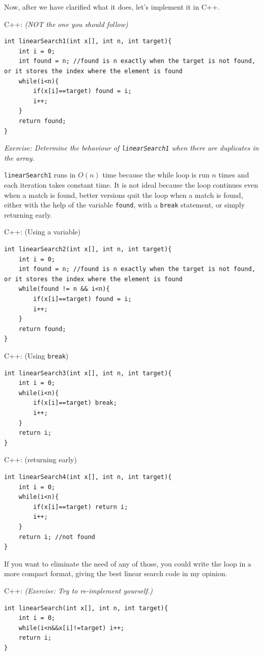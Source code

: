 Now, after we have clarified what it does, let's implement it in C++.


C++: \textit{(NOT the one you should follow)}
\begin{lstlisting}
int linearSearch1(int x[], int n, int target){
    int i = 0;
    int found = n; //found is n exactly when the target is not found, or it stores the index where the element is found
    while(i<n){
        if(x[i]==target) found = i;
        i++;
    }
    return found;
}
\end{lstlisting}

\textit{Exercise: Determine the behaviour of \texttt{linearSearch1} when there are duplicates in the array.}


\texttt{linearSearch1} runs in $O(n)$ time because the while loop is run $n$ times and each iteration takes constant time. It is not ideal because the loop continues even when a match is found, better versions quit the loop when a match is found, either with the help of the variable \texttt{found}, with a \texttt{break} statement, or simply returning early.


C++: (Using a variable)
\begin{lstlisting}
int linearSearch2(int x[], int n, int target){
    int i = 0;
    int found = n; //found is n exactly when the target is not found, or it stores the index where the element is found
    while(found != n && i<n){
        if(x[i]==target) found = i;
        i++;
    }
    return found;
}
\end{lstlisting}

C++: (Using \texttt{break})
\begin{lstlisting}
int linearSearch3(int x[], int n, int target){
    int i = 0;
    while(i<n){
        if(x[i]==target) break;
        i++;
    }
    return i;
}
\end{lstlisting}

C++: (returning early)
\begin{lstlisting}
int linearSearch4(int x[], int n, int target){
    int i = 0;
    while(i<n){
        if(x[i]==target) return i;
        i++;
    }
    return i; //not found
}
\end{lstlisting}

If you want to eliminate the need of any of those, you could write the loop in a more compact format, giving the best linear search code in my opinion.


C++: \textit{(Exercise:  Try to re-implement yourself.)}
\begin{lstlisting} 
int linearSearch(int x[], int n, int target){
    int i = 0;
    while(i<n&&x[i]!=target) i++;
    return i;
}
\end{lstlisting}

